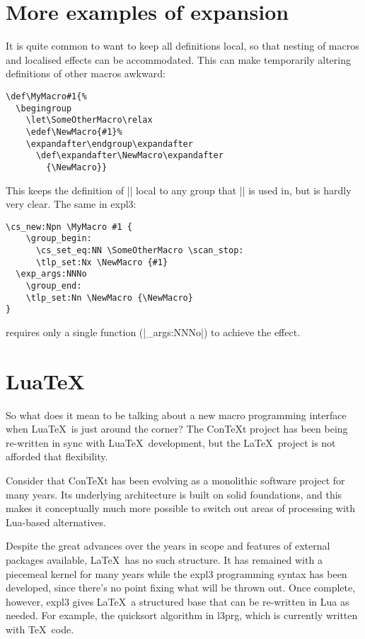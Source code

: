 \documentclass{ltugboat}
\def\pkg#1{\textsf{#1}}
\begin{document}
\section{More examples of expansion}

It is quite common to want to keep all definitions local, so that
nesting of macros and localised effects can be accommodated.  This can
make temporarily altering definitions of other macros awkward:
\begin{lstlisting}
\def\MyMacro#1{%
  \begingroup
    \let\SomeOtherMacro\relax
    \edef\NewMacro{#1}%
    \expandafter\endgroup\expandafter
      \def\expandafter\NewMacro\expandafter
        {\NewMacro}}
\end{lstlisting}
This keeps the definition of |\NewMacro| local to any group that |\MyMacro|
is used in, but is hardly very clear.  The same in \pkg{expl3}:
\begin{lstlisting}
\cs_new:Npn \MyMacro #1 {
    \group_begin:
      \cs_set_eq:NN \SomeOtherMacro \scan_stop:
      \tlp_set:Nx \NewMacro {#1}
  \exp_args:NNNo 
    \group_end: 
    \tlp_set:Nn \NewMacro {\NewMacro}
}
\end{lstlisting}
requires only a single function (|\exp_args:NNNo|) to achieve the effect.

\section{Lua\TeX}

So what does it mean to be talking about a new macro programming interface
when Lua\TeX\ is just around the corner? The Con\TeX{}t project has been being
re-written in sync with Lua\TeX\ development, but the \LaTeX\ project is not
afforded that flexibility.

Consider that Con\TeX{}t has been evolving as a monolithic software project
for many years. Its underlying architecture is built on solid foundations, and
this makes it conceptually much more possible to switch out areas of
processing with Lua-based alternatives.

Despite the great advances over the years in scope and features of external
packages available, \LaTeX\ has no such structure. It has remained with a
piecemeal kernel for many years while the \pkg{expl3} programming syntax has
been developed, since there's no point fixing what will be thrown out. Once
complete, however, \pkg{expl3} gives \LaTeX\ a structured base that can be
re-written in Lua as needed. For example, the quicksort algorithm in
\pkg{l3prg}, which is currently written with \TeX\ code.
\end{document}

